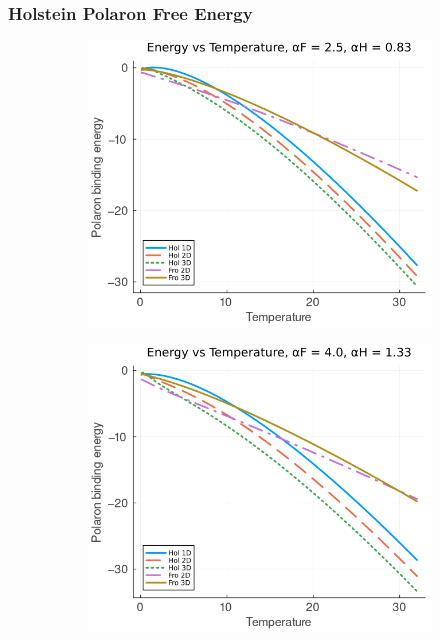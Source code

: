 \subsubsection{Holstein Polaron Free Energy}

\begin{figure}[!tbp]
  \begin{subfigure}[b]{0.49\textwidth}
    \includegraphics[width=\textwidth]{figures/energy_temp_25_083.png}
  \end{subfigure}
  \hfill
  \begin{subfigure}[b]{0.49\textwidth}
    \includegraphics[width=\textwidth]{figures/energy_temp_4_133.png}

\end{subfigure}
\end{figure}
